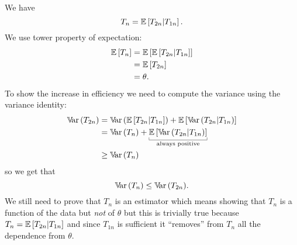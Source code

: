 \documentclass[12pt]{report}
\begin{document}
\begin{fancyproof}
	We have
	\begin{equation*}
		T_{n}=\mathbb{E}\left[T_{2n}|T_{1n}\right].
	\end{equation*}
	We use tower property of expectation:
	\begin{align*}
		\mathbb{E}\left[T_{n}\right]&=\mathbb{E}\left[\mathbb{E}\left[T_{2n}|T_{1n}\right]\right]\\
		&=\mathbb{E}\left[T_{2n}\right]\\
		&=\theta.
	\end{align*}
	To show the increase in efficiency we need to compute the variance using the variance identity:
	\begin{align*}
		\var(T_{2n})&=\var(\ev{T_{2n}|T_{1n}})+\ev{\var(T_{2n}|T_{1n})}\\
		&=\var(T_{n})+\ubracketthin{\ev{\var(T_{2n}|T_{1n})}}_{\claptext{always positive}}\\
		&\geq\var(T_{n})
	\end{align*}
	so we get that
	\begin{equation*}
		\mathbb{V}\!\mathrm{ar}\,(T_{n})\leq\mathbb{V}\!\mathrm{ar}\,(T_{2n}).
	\end{equation*}
	We still need to prove that $T_{n}$ is an estimator which means showing that $T_{n}$ is a function of the data but \textit{not} of $\theta$ but this is trivially true because $T_{n}=\mathbb{E}\left[T_{2n}|T_{1n}\right]$ and since $T_{1n}$ is sufficient it ``removes'' from $T_{n}$ all the dependence from $\theta$.
\end{fancyproof}
\end{document}
